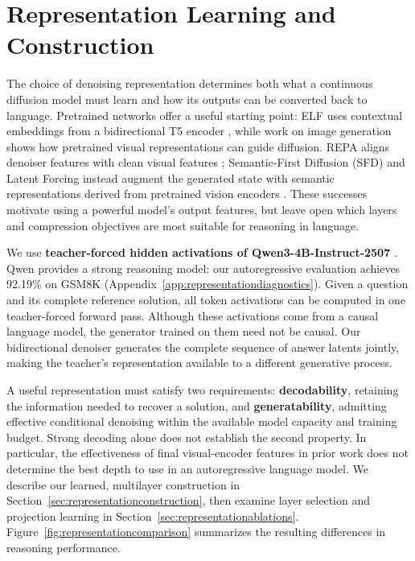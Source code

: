 \section{Representation Learning and Construction}
\label{sec:representation}

The choice of denoising representation determines both what a continuous diffusion model must learn and how its outputs can be converted back to language. Pretrained networks offer a useful starting point: ELF uses contextual embeddings from a bidirectional T5 encoder \citep{elf}, while work on image generation shows how pretrained visual representations can guide diffusion. REPA aligns denoiser features with clean visual features \citep{repa}; Semantic-First Diffusion (SFD) and Latent Forcing instead augment the generated state with semantic representations derived from pretrained vision encoders \citep{sfd,latentforcing}. These successes motivate using a powerful model's output features, but leave open which layers and compression objectives are most suitable for reasoning in language.

We use \textbf{teacher-forced hidden activations of Qwen3-4B-Instruct-2507} \citep{qwen2507}. Qwen provides a strong reasoning model: our autoregressive evaluation achieves 92.19\% on GSM8K (Appendix~\ref{app:representationdiagnostics}). Given a question and its complete reference solution, all token activations can be computed in one teacher-forced forward pass. Although these activations come from a causal language model, the generator trained on them need not be causal. Our bidirectional denoiser generates the complete sequence of answer latents jointly, making the teacher's representation available to a different generative process.

A useful representation must satisfy two requirements: \textbf{decodability}, retaining the information needed to recover a solution, and \textbf{generatability}, admitting effective conditional denoising within the available model capacity and training budget. Strong decoding alone does not establish the second property. In particular, the effectiveness of final visual-encoder features in prior work does not determine the best depth to use in an autoregressive language model. We describe our learned, multilayer construction in Section~\ref{sec:representationconstruction}, then examine layer selection and projection learning in Section~\ref{sec:representationablations}. Figure~\ref{fig:representationcomparison} summarizes the resulting differences in reasoning performance.

